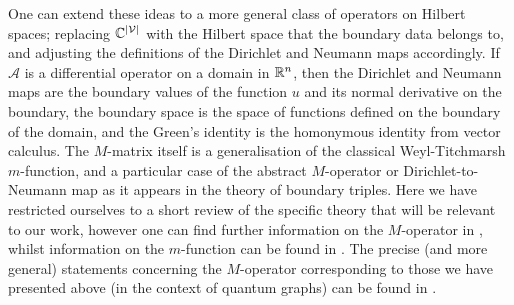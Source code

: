 One can extend these ideas to a more general class of operators on Hilbert spaces; replacing $\mathbb{C}^{\left\lvert \mathcal{V} \right\rvert}$ with the Hilbert space that the boundary data belongs to, and adjusting the definitions of the Dirichlet and Neumann maps accordingly.
If $\mathcal{A}$ is a differential operator on a domain in $\mathbb{R}^n$, then the Dirichlet and Neumann maps are the boundary values of the function $u$ and its normal derivative on the boundary, the boundary space is the space of functions defined on the boundary of the domain, and the Green's identity is the homonymous identity from vector calculus.
The $M$-matrix itself is a generalisation of the classical Weyl-Titchmarsh $m$-function, and a particular case of the abstract $M$-operator or Dirichlet-to-Neumann map as it appears in the theory of boundary triples.
Here we have restricted ourselves to a short review of the specific theory that will be relevant to our work, however one can find further information on the $M$-operator in \cite{kochubei1975extensions, kochubei1980characteristic, gorbachuk1991boundary, brown2008boundary, brown2020functional, cherednichenko2020scattering, cherednichenko2018functional}, whilst information on the $m$-function can be found in \cite{titchmarsh1962eigenfunction, atkinson1964discrete}.
The precise (and more general) statements concerning the $M$-operator corresponding to those we have presented above (in the context of quantum graphs) can be found in \cite{derkach1991generalized, derkach2014boundary}.

